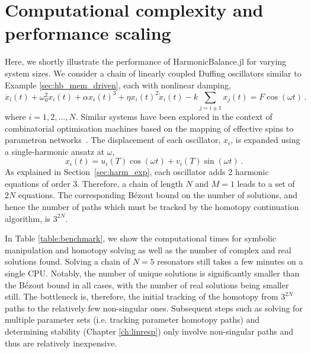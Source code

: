 \section{Computational complexity and performance scaling}\label{sec:hardexample}
    Here, we shortly illustrate the performance of HarmonicBalance.jl for varying system sizes. We consider a chain of linearly coupled Duffing oscillators similar to Example \ref{sec:hb_mem_driven}, each with nonlinear damping,
    \begin{equation} \label{eq:Duffing_chain}
    \ddot{x}_i(t) + \omega_0^2 x_i(t) +  \alpha x_i(t)^3 + \eta x_i(t)^2 \dot{x}_i(t) - k \sum_{j=i\pm1} x_j(t) = F \cos(\omega t)\,.
    \end{equation}
    where $i = 1,2,..., N$. 
    Similar systems have been explored in the context of combinatorial optimisation machines based on the mapping of effective spins to parametron networks~\cite{Wang2013,Bello2019a,CalvaneseStrinati2019,2019PhRvL.123y4102F,CalvaneseStrinati2020,Heugel_2022}.
    The displacement of each oscillator, $x_i$, is expanded using a single-harmonic ansatz at $\omega$,
    \begin{equation}
    x_i(t) = u_i(T) \cos(\omega t ) + v_i(T) \sin(\omega t) \,.
    \end{equation}
    As explained in Section~\ref{sec:harm_exp}, each oscillator adds 2 harmonic equations of order 3. Therefore, a chain of length $N$ and $M=1$ leads to a set of $2{N}$ equations. The corresponding B\'{e}zout bound on the number of solutions, and hence the number of paths which must be tracked by the homotopy continuation algorithm, is $3^{2{N}}$. 
    
    In Table \ref{table:benchmark}, we show the computational times for symbolic manipulation and homotopy solving as well as the number of complex and real solutions found. Solving a chain of $N=5$ resonators still takes a few minutes on a single CPU. Notably, the number of unique solutions is significantly smaller than the B\'{e}zout bound in all cases, with the number of real solutions being smaller still. The bottleneck is, therefore, the initial tracking of the homotopy from $3^{2{N}}$ paths to the relatively few non-singular ones. Subsequent steps such as solving for multiple parameter sets (i.e. tracking parameter homotopy paths) and determining stability (Chapter \ref{ch:linresp}) only involve non-singular paths and thus are relatively inexpensive.
    
